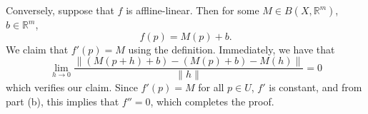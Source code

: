 \documentclass{article}
\theoremstyle{plain} %
\numberwithin{thm}{section} %
\theoremstyle{definition}
\begin{document}
\begin{question}{25}
    Conversely, suppose that \(f\) is affline-linear. Then for some \(M \in B(X, \mathbb{R}^m)\), \(b \in \mathbb{R}^m\),
    \[
        f(p) = M(p) + b \text{.} 
    \]
    We claim that \(f'(p) = M\) using the definition. Immediately, we have that
    \[
        \lim_{h \to 0} \frac{\|(M(p+h) + b) - (M(p) + b) - M(h)\|}{\|h\|} = 0
    \]
    which verifies our claim. Since \(f'(p) = M\) for all \(p \in U\), \(f'\) is constant, and from part (b), this implies that \(f'' = 0\), which completes the proof.
    \end{question}
\end{document}
